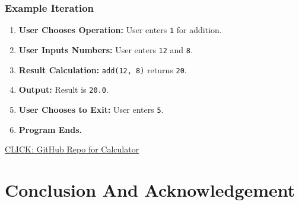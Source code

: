 \documentclass{article}
\begin{document}
\subsubsection*{Example Iteration}

\begin{enumerate}
    \item \textbf{User Chooses Operation:} User enters \texttt{1} for addition.
    \item \textbf{User Inputs Numbers:} User enters \texttt{12} and \texttt{8}.
    \item \textbf{Result Calculation:} \texttt{add(12, 8)} returns \texttt{20}.
    \item \textbf{Output:} Result is \texttt{20.0}.
    \item \textbf{User Chooses to Exit:} User enters \texttt{5}.
    \item \textbf{Program Ends.}
\end{enumerate}

\href{https://github.com/jitsharma2003/create-calculator.c}{CLICK: GitHub Repo for Calculator}


\newpage

\newpage


\newpage

\section*{Conclusion And Acknowledgement}
\end{document}
